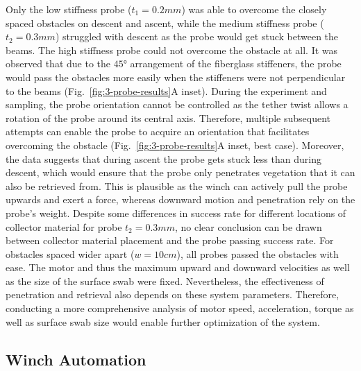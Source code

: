 Only the low stiffness probe ($t_1=0.2mm$) was able to overcome the closely spaced obstacles on descent and ascent, while the medium stiffness probe ($t_2=0.3mm$) struggled with descent as the probe would get stuck between the beams. The high stiffness probe could not overcome the obstacle at all. It was observed that due to the $\ang{45}$ arrangement of the fiberglass stiffeners, the probe would pass the obstacles more easily when the stiffeners were not perpendicular to the beams  (Fig.~\ref{fig:3-probe-results}A inset). During the experiment and sampling, the probe orientation cannot be controlled as the tether twist allows a rotation of the probe around its central axis. Therefore, multiple subsequent attempts can enable the probe to acquire an orientation that facilitates overcoming the obstacle  (Fig.~\ref{fig:3-probe-results}A inset, best case). Moreover, the data suggests that during ascent the probe gets stuck less than during descent, which would ensure that the probe only penetrates vegetation that it can also be retrieved from.
%
This is plausible as the winch can actively pull the probe upwards and exert a force, whereas downward motion and penetration rely on the probe's weight.
%
%
Despite some differences in success rate for different locations of collector material for probe $t_2=0.3mm$, no clear conclusion can be drawn between collector material placement and the probe passing success rate. For obstacles spaced wider apart ($w=10cm$), all probes passed the obstacles with ease. The motor and thus the maximum upward and downward velocities as well as the size of the surface swab were fixed. Nevertheless, the effectiveness of penetration and retrieval also depends on these system parameters. Therefore, conducting a more comprehensive analysis of motor speed, acceleration, torque as well as surface swab size would enable further optimization of the system.

\subsection{Winch Automation}
\label{sec:results-automation}

